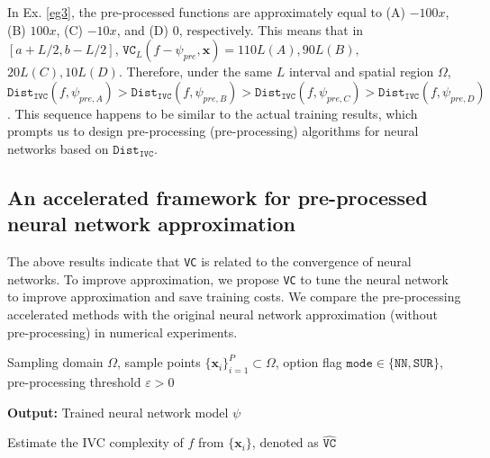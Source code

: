 \documentclass[final]{siamart220329}
\newtheorem{theoretical insights}{Theoretical insights}
\newtheorem{practical takeaway}{Practical takeaway}
\begin{document}
{{{{\begin{sloppypar}
{In Ex. \ref{eg3}, the pre-processed functions are approximately equal to (A) $-100x$, (B) $100x$, (C) $-10x$, and (D) $0$, respectively. {\color{black}This means that in \([a+L/2,b-L/2]\), \(\texttt{VC}_L(f-\psi_{pre},{\bm x})=110L (A), 90L (B),\) \( 20L(C), 10L(D)\).}  Therefore, under the same $L$ interval and spatial region $\Omega$, $\texttt{Dist}_{\texttt{IVC}}(f,\psi_{pre,A})>\texttt{Dist}_{\texttt{IVC}}(f,\psi_{pre,B})>\texttt{Dist}_{\texttt{IVC}}(f,\psi_{pre,C})>\texttt{Dist}_{\texttt{IVC}}(f,\psi_{pre,D})$. This sequence happens to be similar to the actual training results, which prompts us to design pre-processing (pre-processing) algorithms for neural networks based on $\texttt{Dist}_{\texttt{IVC}}$.}
\end{sloppypar}


\subsection{An accelerated framework for pre-processed neural network approximation}


The above results indicate that \texttt{VC} is related to the convergence of neural networks. To improve approximation, we propose \texttt{VC} to tune the neural network to improve approximation and save training costs. We compare the pre-processing accelerated methods with the original neural network approximation (without pre-processing) in numerical experiments. 
 


\begin{algorithm}
\caption{Neural Network Approximation with Pre-processing Under {\ttfamily IVC}}\label{Alg1}
\begin{algorithmic}[1] \small 
\Require Sampling domain \( \Omega \), sample points \( \{\bm{x}_i\}_{i=1}^P \subset \Omega \), option flag \( \texttt{mode} \in \{\texttt{NN}, \texttt{SUR}\} \), pre-processing threshold \( \varepsilon > 0 \) 

\noindent \hspace{-0.7cm} {\bf Output:} Trained neural network model \( \psi \)

\State Estimate the {\ttfamily IVC} complexity of \( f \) from \( \{\bm{x}_i\} \), denoted as \( \widehat{\texttt{VC}} \)
 

\end{algorithmic}
\end{algorithm}}}}}
\end{document}
